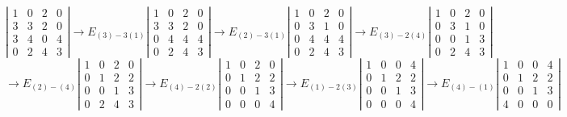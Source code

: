 \documentclass{amsart}
\begin{document}
$$
\left|\begin{array}{rrrr}
	1 & 0 & 2 & 0 \\
	3 & 3 & 2 & 0 \\
	3 & 4 & 0 & 4 \\
	0 & 2 & 4 & 3
\end{array}\right| 
\to E_{(3) - 3(1)}
\left|\begin{array}{rrrr}
	1 & 0 & 2  & 0 \\
	3 & 3 & 2  & 0 \\
	0 & 4 & 4 & 4 \\
	0 & 2 & 4  & 3
\end{array}\right| 
\to E_{(2) - 3(1)}
\left|\begin{array}{rrrr}
	1 & 0 & 2  & 0 \\
	0 & 3 & 1  & 0 \\
	0 & 4 & 4  & 4 \\
	0 & 2 & 4  & 3
\end{array}\right| 
\to E_{(3) - 2(4)}
\left|\begin{array}{rrrr}
	1 & 0 & 2 & 0 \\
	0 & 3 & 1 & 0 \\
	0 & 0 & 1 & 3 \\
	0 & 2 & 4 & 3
\end{array}\right|
$$
$$
\to E_{(2) - (4)}
\left|\begin{array}{rrrr}
	1 & 0 & 2 & 0 \\
	0 & 1 & 2 & 2 \\
	0 & 0 & 1 & 3 \\
	0 & 2 & 4 & 3
\end{array}\right| 
\to E_{(4) - 2(2)}
\left|\begin{array}{rrrr}
	1 & 0 & 2 & 0 \\
	0 & 1 & 2 & 2 \\
	0 & 0 & 1 & 3 \\
	0 & 0 & 0 & 4
\end{array}\right| 
\to E_{(1) - 2(3)}
\left|\begin{array}{rrrr}
	1 & 0 & 0 & 4 \\
	0 & 1 & 2 & 2 \\
	0 & 0 & 1 & 3 \\
	0 & 0 & 0 & 4
\end{array}\right| 
\to E_{(4) - (1)}
\left|\begin{array}{rrrr}
	1 & 0 & 0 & 4 \\
	0 & 1 & 2 & 2 \\
	0 & 0 & 1 & 3 \\
	4 & 0 & 0 & 0
\end{array}\right| 
$$
\end{document}
